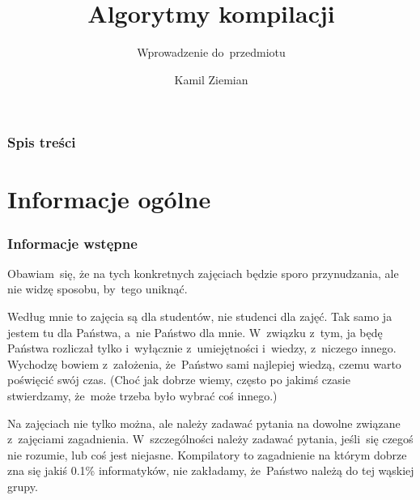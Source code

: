 \documentclass[10pt,t]{beamer}
\title{Algorytmy kompilacji}
\subtitle{Wprowadzenie do~przedmiotu}
\author{Kamil Ziemian}
\begin{document}





\RaggedRight





\maketitle





\begin{frame}
  \frametitle{Spis treści}


  \tableofcontents

\end{frame}





\section{Informacje ogólne}





\begin{frame}
  \frametitle{Informacje wstępne}


  Obawiam~się, że na tych konkretnych zajęciach będzie sporo przynudzania,
  ale nie widzę sposobu, by~tego uniknąć.

  Według mnie to zajęcia są dla studentów, nie studenci dla zajęć. Tak samo
  ja jestem tu dla Państwa, a~nie Państwo dla mnie. W~związku z~tym, ja
  będę Państwa rozliczał tylko i~wyłącznie z~umiejętności i~wiedzy,
  z~niczego innego. Wychodzę bowiem z~założenia, że~Państwo sami najlepiej
  wiedzą, czemu warto poświęcić swój czas. (Choć jak dobrze wiemy, często
  po jakimś czasie stwierdzamy, że~może trzeba było wybrać coś innego.)

  Na zajęciach nie tylko można, ale \alert{należy} zadawać pytania
  na dowolne związane z~zajęciami zagadnienia. W~szczególności
  \alert{należy} zadawać pytania, jeśli~się czegoś nie rozumie, lub coś
  jest niejasne. Kompilatory to zagadnienie na którym dobrze zna się jakiś
  0.1\% informatyków, \alert{nie} zakładamy, że~Państwo należą do tej
  wąskiej grupy.

\end{frame}
\end{document}
